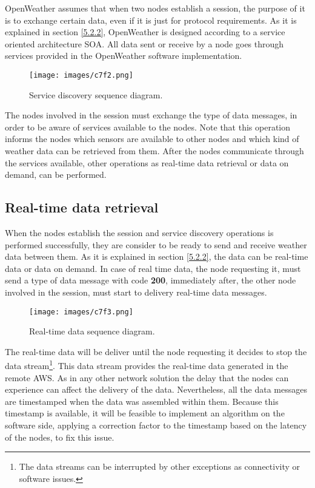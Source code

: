OpenWeather assumes that when two nodes establish a session, the purpose of it is to exchange certain data, even if it is just for protocol requirements. As it is explained in section \ref{5.2.2}, OpenWeather is designed according to a service oriented architecture \gls{SOA}. All data sent  or receive by a node goes through services provided in the OpenWeather software implementation.

\begin{figure}[H]
\centerline{\texttt{[image: images/c7f2.png]}}
\caption{Service discovery sequence diagram.}
\end{figure}

The nodes involved in the session must exchange the type of data messages, in order to be aware of services available to the nodes. Note that this operation informs the nodes which sensors are available to other nodes and which kind of weather data can be retrieved from them. After the nodes communicate through the services available, other operations as real-time data retrieval or data on demand, can be performed.

\subsection{Real-time data retrieval}\label{7.3.3}

When the nodes establish the session  and service discovery operations is performed successfully, they are consider to be ready to send and receive weather data between them. As it is explained in section \ref{5.2.2}, the data can be real-time data or data on demand. In case of real time data, the node requesting it, must send a type of data message with code \textbf{200}, immediately after, the other node involved in the session, must start to delivery real-time data messages.

\begin{figure}[H]
\centerline{\texttt{[image: images/c7f3.png]}}
\caption{Real-time data sequence diagram.}
\end{figure}

The real-time data will be deliver until the node requesting it decides to stop the data stream\footnote{The data streams can be interrupted by other exceptions as connectivity or software issues.}. This data stream provides the real-time data generated in the remote \gls{AWS}. As in any other network solution the delay that the nodes can experience can affect the delivery of the data. Nevertheless, all the data messages are timestamped when the data was assembled within them. Because this timestamp is available, it will be feasible to implement an algorithm on the software side,  applying a correction factor to the timestamp based on the latency of the nodes, to fix this issue.


